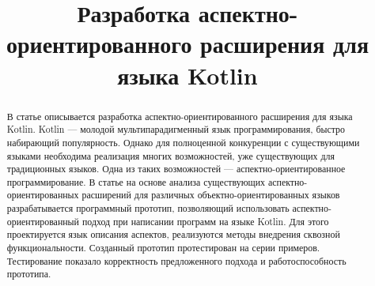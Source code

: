 \documentclass[conference]{IEEEtran}
\begin{document}
%
%
\title{Разработка аспектно-ориентированного расширения для языка Kotlin}


\author{
\and
{}
}

\maketitle

\begin{abstract}

В статье описывается разработка аспектно-ориентированного расширения для языка
Kotlin. Kotlin --- молодой мультипарадигменный язык программирования, быстро
набирающий популярность. Однако для полноценной конкуренции с существующими 
языками необходима реализация многих возможностей, уже существующих для
традиционных языков. Одна из таких возможностей --- аспектно-ориентированное 
программирование. 
В статье на основе анализа существующих аспектно-ориентированных расширений 
для различных объектно-ориентированных языков разрабатывается программный 
прототип, позволяющий использовать аспектно-ориентированный подход при 
написании программ на языке Kotlin. Для этого проектируется язык описания 
аспектов, реализуются методы внедрения сквозной функциональности. Созданный
прототип протестирован на серии примеров. Тестирование показало корректность
предложенного подхода и работоспособность прототипа.
\end{abstract}
\end{document}
